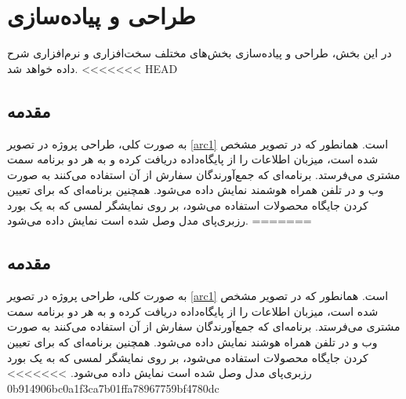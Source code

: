 \chapter{طراحی و پیاده‌سازی}
در این بخش، طراحی و پیاده‌سازی بخش‌های مختلف سخت‌افزاری و نرم‌افزاری شرح داده خواهد شد.
<<<<<<< HEAD
\section{مقدمه}به صورت کلی، طراحی پروژه در تصویر \ref{arc1} است. همانطور که در تصویر مشخص شده است، میزبان اطلاعات را از پایگاه‌داده دریافت کرده و به هر دو برنامه سمت مشتری می‌فرستد. برنامه‌ای که جمع‌آورندگان سفارش از آن استفاده می‌کنند به صورت وب و در تلفن همراه هوشمند نمایش داده می‌شود. همچنین برنامه‌ای که برای تعیین کردن جایگاه محصولات استفاده می‌شود، بر روی نمایشگر لمسی که به یک بورد رزبری‌پای مدل  وصل شده است نمایش داده می‌شود.
=======
\section{مقدمه}به صورت کلی، طراحی پروژه در تصویر \ref{arc1} است. همانطور که در تصویر مشخص شده است، میزبان اطلاعات را از پایگاه‌داده دریافت کرده و به هر دو برنامه سمت مشتری می‌فرستد. برنامه‌ای که جمع‌آورندگان سفارش از آن استفاده می‌کنند به صورت وب و در تلفن همراه هوشند نمایش داده می‌شود. همچنین برنامه‌ای که برای تعیین کردن جایگاه محصولات استفاده می‌شود، بر روی نمایشگر لمسی که به یک بورد رزبری‌پای مدل  وصل شده است نمایش داده می‌شود.
>>>>>>> 0b914906bc0a1f3ca7b01ffa78967759bf4780dc

